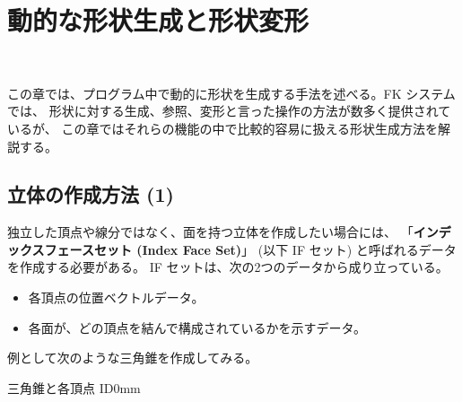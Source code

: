 \chapter{動的な形状生成と形状変形} \label{chap:easygen} ~

この章では、プログラム中で動的に形状を生成する手法を述べる。FK システムでは、
形状に対する生成、参照、変形と言った操作の方法が数多く提供されているが、
この章ではそれらの機能の中で比較的容易に扱える形状生成方法を解説する。

\section{立体の作成方法 (1)} \label{sec:solidGen1}
独立した頂点や線分ではなく、面を持つ立体を作成したい場合には、
「\textbf{インデックスフェースセット (Index Face Set)}」
(以下 IF セット) と呼ばれるデータを作成する必要がある。
IF セットは、次の2つのデータから成り立っている。
\begin{itemize}
 \item 各頂点の位置ベクトルデータ。
 \item 各面が、どの頂点を結んで構成されているかを示すデータ。
\end{itemize}
例として次のような三角錐を作成してみる。

	{三角錐と各頂点 ID}{0mm}

